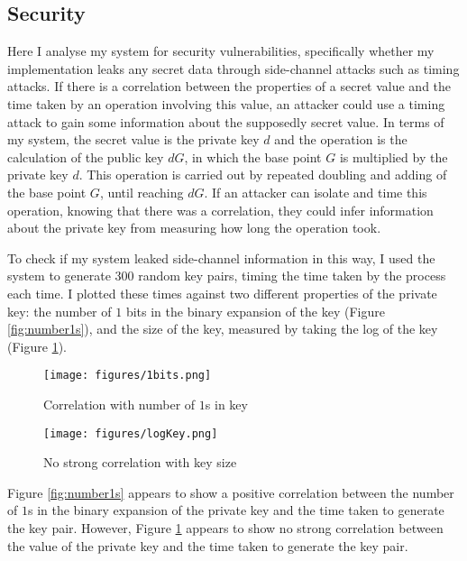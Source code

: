 \documentclass[12pt,a4paper]{article}
\begin{document}
\subsection{Security} \noindent \label{Security}
Here I analyse my system for security vulnerabilities, 
specifically whether my implementation leaks any secret data through side-channel attacks such as timing attacks. 
If there is a correlation between the properties of a secret value and the time taken by an operation involving this value, 
an attacker could use a timing attack to gain some information about the supposedly secret value. 
In terms of my system, the secret value is the private key $d$ and the operation is the calculation of the public key $dG$, 
in which the base point $G$ is multiplied by the private key $d$. 
This operation is carried out by repeated doubling and adding of the base point $G$, until reaching $dG$. 
If an attacker can isolate and time this operation, knowing that there was a correlation, 
they could infer information about the private key from measuring how long the operation took. 

To check if my system leaked side-channel information in this way, 
I used the system to generate 300 random key pairs, timing the time taken by the process each time. 
I plotted these times against two different properties of the private key: 
the number of $1$ bits in the binary expansion of the key (Figure \ref{fig:number1s}), 
and the size of the key, measured by taking the log of the key (Figure \ref{fig:logkey}). 

\begin{figure}[!htb]
    \begin{minipage}{0.5\textwidth}
        \centering
        \texttt{[image: figures/1bits.png]}
        \caption{Correlation with number of $1$s in key}
        \label{fig:number1s}
    \end{minipage}\hfill
    \begin{minipage}{0.5\textwidth}
        \centering
        \texttt{[image: figures/logKey.png]}
        \caption{No strong correlation with key size}
        \label{fig:logkey}
    \end{minipage}
\end{figure}

Figure \ref{fig:number1s} appears to show a positive correlation between the number of $1$s in the binary expansion of the private key and the time taken to generate the key pair. 
However, Figure \ref{fig:logkey} appears to show no strong correlation between the value of the private key and the time taken to generate the key pair. 
\end{document}
